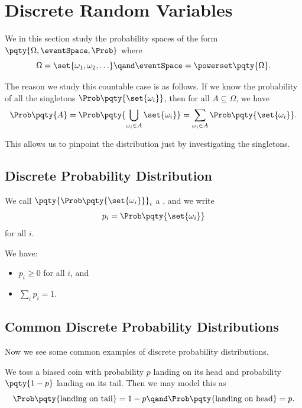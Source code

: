 \section{Discrete Random Variables}

We in this section study the probability spaces of the form \(\pqty{\Omega, \eventSpace, \Prob}\) where
\[
    \Omega = \set{\omega_1, \omega_2, \ldots} \qand \eventSpace = \powerset\pqty{\Omega}.
\]

The reason we study this countable case is as follows. If we know the probability of all the singletons \(\Prob\pqty{\set{\omega_i}}\), then for all \(A \subseteq \Omega\), we have
\[
    \Prob\pqty{A} = \Prob\pqty{\bigcup_{\omega_i \in A} \set{\omega_i}} = \sum_{\omega_i \in A} \Prob\pqty{\set{\omega_i}}.
\]

This allows us to pinpoint the distribution just by investigating the singletons.

\subsection{Discrete Probability Distribution}

\begin{definition}
    \label{def:discrete-probability-distribution}%
    We call \(\pqty{\Prob\pqty{\set{\omega_i}}}_i\) a , and we write
    \[
        p_i = \Prob\pqty{\set{\omega_i}}
    \]
    for all \(i\).
\end{definition}

We have:
\begin{itemize}
    \item \(p_i \geq 0\) for all \(i\), and
    \item \(\sum_i p_i = 1\).
\end{itemize}

\subsection{Common Discrete Probability Distributions}

Now we see some common examples of discrete probability distributions.

\begin{example}
    \label{ex:tossing-biased-coin}%
    We toss a biased coin with probability \(p\) landing on its head and probability \(\pqty{1 - p}\) landing on its tail. Then we may model this as
    \[
        \Prob\pqty{\text{landing on tail}} = 1 - p \qand \Prob\pqty{\text{landing on head}} = p.
    \]
\end{example}

